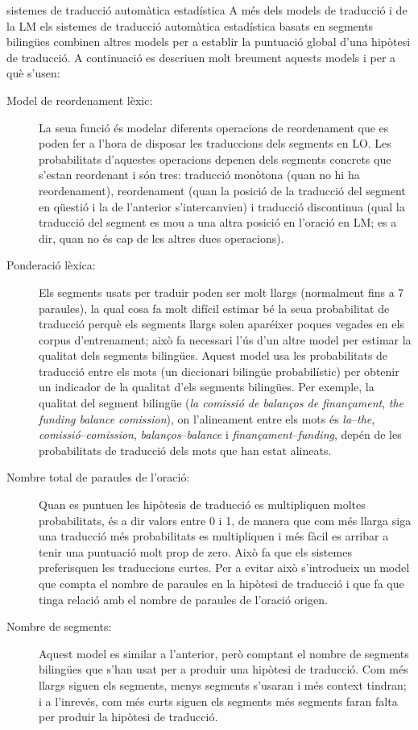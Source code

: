 \begin{persabermes}{sistemes de traducció automàtica estadística}
  A més dels models de traducció i de la LM els sistemes de traducció
  automàtica estadística basats en segments bilingües combinen altres
  models per a establir la puntuació global d'una hipòtesi de
  traducció. A continuació es descriuen molt breument aquests models i
  per a què s'usen:
  \begin{description}
  \item[Model de reordenament lèxic:] La seua funció és modelar
    diferents operacions de reordenament que es poden fer a l'hora de
    disposar les traduccions dels segments en LO. Les probabilitats
    d'aquestes operacions depenen dels segments concrets que s'estan
    reordenant i són tres: traducció monòtona (quan no hi ha
    reordenament), reordenament (quan la posició de la traducció del
    segment en qüestió i la de l'anterior s'intercanvien) i traducció
    discontinua (qual la traducció del segment es mou a una altra
    posició en l'oració en LM; es a dir, quan no és cap de les altres
    dues operacions).
  \item[Ponderació lèxica:] Els segments usats per traduir poden ser
    molt llargs (normalment fins a 7 paraules), la qual cosa fa molt
    difícil estimar bé la seua probabilitat de traducció perquè els
    segments llargs solen aparéixer poques vegades en els corpus
    d'entrenament; això fa necessari l'ús d'un altre model per estimar
    la qualitat dels segments bilingües. Aquest model usa les
    probabilitats de traducció entre els mots (un diccionari bilingüe
    probabilístic) per obtenir un indicador de la qualitat d'els
    segments bilingües. Per exemple, la qualitat del segment bilingüe
    (\emph{la comissió de balanços de finançament}, \emph{the funding
      balance comission}), on l'alineament entre els mots és
    \emph{la}--\emph{the}, \emph{comissió}--\emph{comission},
    \emph{balanços}--\emph{balance} i
    \emph{finançament}--\emph{funding}, depén de les probabilitats de
    traducció dels mots que han estat alineats.
  \item[Nombre total de paraules de l'oració:] Quan es puntuen les
    hipòtesis de traducció es multipliquen moltes probabilitats, és a
    dir valors entre 0 i 1, de manera que com més llarga siga una
    traducció més probabilitats es multipliquen i més fàcil es arribar
    a tenir una puntuació molt prop de zero. Això fa que els sistemes
    preferisquen les traduccions curtes. Per a evitar això
    s'introdueix un model que compta el nombre de paraules en la
    hipòtesi de traducció i que fa que tinga relació amb el nombre de
    paraules de l'oració origen.
  \item[Nombre de segments:] Aquest model es similar a l'anterior, però
    comptant el nombre de segments bilingües que s'han usat per a
    produir una hipòtesi de traducció. Com més llargs siguen els
    segments, menys segments s'usaran i més context tindran; i a
    l'inrevés, com més curts siguen els segments més segments faran
    falta per produir la hipòtesi de traducció.
  \end{description}


\end{persabermes}
